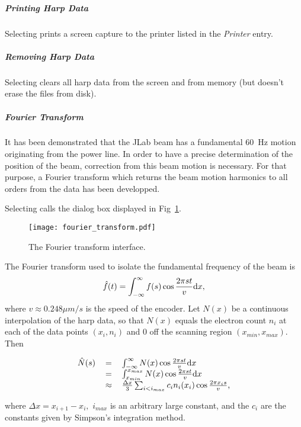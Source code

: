 	\subparagraph{Printing Harp Data}

Selecting  prints a screen capture to the printer listed in the {\it Printer} entry.

	\subparagraph{Removing Harp Data}

Selecting  clears all harp data from the screen and from memory (but doesn't
erase the files from disk).


	\subparagraph{Fourier Transform}

It has been demonstrated that the JLab beam has a fundamental 60~Hz motion originating from the power
line. In order to have a precise determination of the position of the beam, correction from this beam
motion is necessary. For that purpose, a Fourier transform which returns the beam motion harmonics to
all orders from the data has been developped.

Selecting  calls the dialog box displayed in Fig~\ref{fig:transform}.
\begin{figure}[htp]
\texttt{[image: fourier\_transform.pdf]}
\caption{The Fourier transform interface.}\label{fig:transform}
\end{figure}
The Fourier transform used to isolate the fundamental frequency of the beam is
\begin{equation}
\hat f(t)=\int_{-\infty}^\infty f(s)\cos \frac{2 \pi s t}{v} {\rm d}x,
\end{equation}
where $v\approx 0.248\mu m/s$ is the speed of the encoder.  Let $N(x)$ be a continuous interpolation of
the harp data, so that $N(x)$ equals the electron count $n_i$ at each of the data points $(x_i, n_i)$ and
0 off the scanning region $(x_{min}, x_{max})$. Then
\begin{center}
\begin{equation}
\begin{tabular}{rcl}
$\hat N(s)$&$=$&$\int_{-\infty}^\infty N(x)\cos \frac{2 \pi s t}{v} {\rm d}x$ \\
	   &$=$&$\int_{x_{min}}^{x_{max}} N(x)\cos \frac{2 \pi s t}{v} {\rm d}x $\\
	   &$\approx$&$ \frac{\Delta x}{3}\sum_{i<i_{max}} c_i n_i(x_i) \cos \frac{2 \pi x_i s}{v}$,
\end{tabular}
\end{equation}
\end{center}
where $\Delta x=x_{i+1}-x_i,$ $i_{max}$ is an arbitrary large constant, and the $c_i$ are the constants given
by Simpson's integration method.

